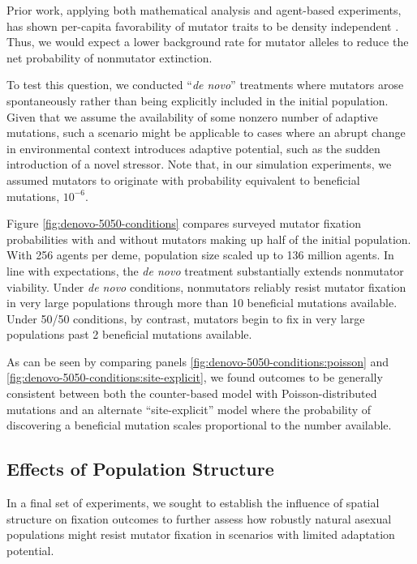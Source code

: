 Prior work, applying both mathematical analysis and agent-based experiments, has shown per-capita favorability of mutator traits to be density independent \citep{raynes2019selection}.
Thus, we would expect a lower background rate for mutator alleles to reduce the net probability of nonmutator extinction.

To test this question, we conducted ``\textit{de novo}'' treatments where mutators arose spontaneously rather than being explicitly included in the initial population.
Given that we assume the availability of some nonzero number of adaptive mutations, such a scenario might be applicable to cases where an abrupt change in environmental context introduces adaptive potential, such as the sudden introduction of a novel stressor.
Note that, in our simulation experiments, we assumed mutators to originate with probability equivalent to beneficial mutations, $10^{-6}$.

Figure \ref{fig:denovo-5050-conditions} compares surveyed mutator fixation probabilities with and without mutators making up half of the initial population.
With 256 agents per deme, population size scaled up to 136 million agents.
In line with expectations, the \textit{de novo} treatment substantially extends nonmutator viability.
Under \textit{de novo} conditions, nonmutators reliably resist mutator fixation in very large populations through more than 10 beneficial mutations available.
Under 50/50 conditions, by contrast, mutators begin to fix in very large populations past 2 beneficial mutations available.

As can be seen by comparing panels \ref{fig:denovo-5050-conditions:poisson} and \ref{fig:denovo-5050-conditions:site-explicit}, we found outcomes to be generally consistent between both the counter-based model with Poisson-distributed mutations and an alternate ``site-explicit'' model where the probability of discovering a beneficial mutation scales proportional to the number available.

\subsection{Effects of Population Structure}
\label{sec:population-structure}

In a final set of experiments, we sought to establish the influence of spatial structure on fixation outcomes to further assess how robustly natural asexual populations might resist mutator fixation in scenarios with limited adaptation potential.

